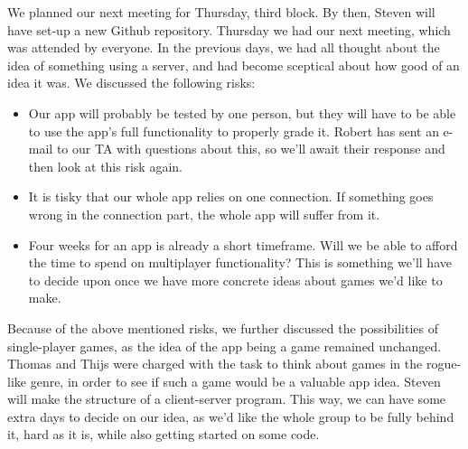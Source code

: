 \documentclass[../main.tex]{subfiles}
\begin{document}
We planned our next meeting for Thursday, third block. By then, Steven will have set-up a new Github repository.
\bigbreak\noindent
Thursday we had our next meeting, which was attended by everyone. In the previous days, we had all thought about the idea of something using a server, and had become sceptical about how good of an idea it was. We discussed the following risks:
\begin{itemize}
	\item Our app will probably be tested by one person, but they will have to be able to use the app's full functionality to properly grade it. Robert has sent an e-mail to our TA with questions about this, so we'll await their response and then look at this risk again.
		\item It is tisky that our whole app relies on one connection. If something goes wrong in the connection part, the whole app will suffer from it.
		\item Four weeks for an app is already a short timeframe. Will we be able to afford the time to spend on multiplayer functionality? This is something we'll have to decide upon once we have more concrete ideas about games we'd like to make.
\end{itemize}
Because of the above mentioned risks, we further discussed the possibilities of single-player games, as the idea of the app being a game remained unchanged. Thomas and Thijs were charged with the task to think about games in the rogue-like genre, in order to see if such a game would be a valuable app idea. Steven will make the structure of a client-server program. This way, we can have some extra days to decide on our idea, as we'd like the whole group to be fully behind it, hard as it is, while also getting started on some code. 
\end{document}
